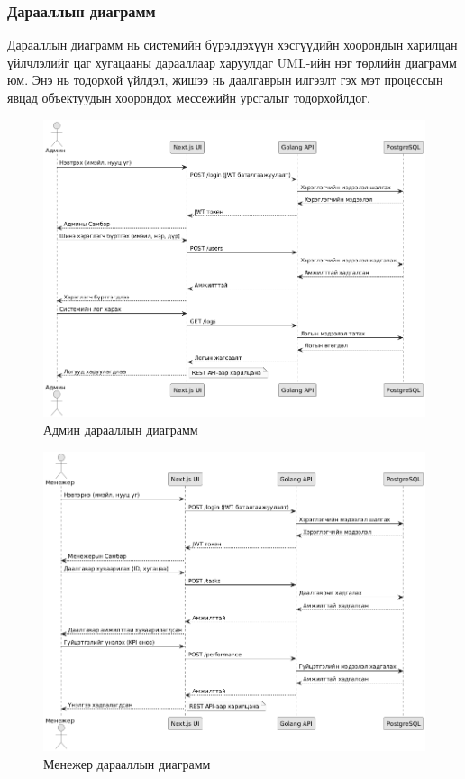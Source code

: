 \subsubsection{Дарааллын диаграмм}
Дарааллын диаграмм нь системийн бүрэлдэхүүн хэсгүүдийн хоорондын харилцан үйлчлэлийг цаг 
хугацааны дарааллаар харуулдаг UML-ийн нэг төрлийн диаграмм юм. Энэ нь тодорхой үйлдэл, жишээ 
нь даалгаврын илгээлт гэх мэт процессын явцад объектуудын хоорондох мессежийн урсгалыг тодорхойлдог.

\begin{figure}[H]
    \centering
    \includegraphics[scale=0.5]{src/images/diagram/admin-seq.png}
    \caption{Админ дарааллын диаграмм}
    \label{fig:admin_seq}
\end{figure}
\begin{figure}[H]
    \centering
    \includegraphics[scale=0.5]{src/images/diagram/manager_seq.png}
    \caption{Менежер дарааллын диаграмм}
    \label{fig:employee_seq}
\end{figure}
